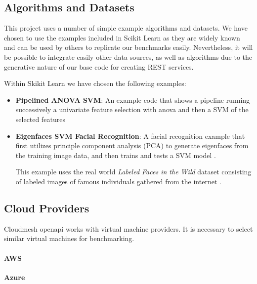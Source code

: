 \subsection{Algorithms and
Datasets}\label{algorithms-and-datasets}

This project uses a number of simple example algorithms and datasets. We
have chosen to use the examples included in Scikit Learn as they are
widely known and can be used by others to replicate our benchmarks
easily. Nevertheless, it will be possible to integrate easily other data
sources, as well as algorithms due to the generative nature of our base
code for creating REST services.

Within Skikit Learn we have chosen the following examples:

\begin{itemize}
\item
  \textbf{Pipelined ANOVA SVM}: An example code that shows a pipeline
  running successively a univariate feature selection with anova and
  then a SVM of the selected features \cite{www-skikit-learn-pipeline,}
\item
  \textbf{Eigenfaces SVM Facial Recognition}: A facial recognition
  example that first utilizes principle component analysis (PCA) to
  generate eigenfaces from the training image data, and then trains and
  tests a SVM model \cite{www-skikit-learn-faces}.

  This example uses the real world {\em Labeled Faces in the Wild} dataset
  consisting of labeled images of famous individuals gathered from the
  internet \cite{faces-data}.

\end{itemize}

\subsection{Cloud Providers}\label{cloud-providers}

Cloudmesh openapi works with virtual machine providers. It is necessary
to select similar virtual machines for benchmarking.

\hypertarget{aws}{%
\paragraph{AWS}\label{aws}}

\hypertarget{azure}{%
\paragraph{Azure}\label{azure}}

